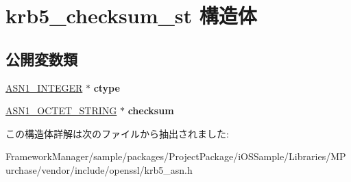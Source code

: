 \hypertarget{structkrb5__checksum__st}{}\section{krb5\+\_\+checksum\+\_\+st 構造体}
\label{structkrb5__checksum__st}
\subsection*{公開変数類}
\begin{DoxyCompactItemize}
\item 
\hypertarget{structkrb5__checksum__st_ae066058605d0c59e10a98fbd71745705}{}\hyperlink{structasn1__string__st}{A\+S\+N1\+\_\+\+I\+N\+T\+E\+G\+E\+R} $\ast$ {\bfseries ctype}\label{structkrb5__checksum__st_ae066058605d0c59e10a98fbd71745705}

\item 
\hypertarget{structkrb5__checksum__st_aaecf3ca4c97259edba8bc729103d81ba}{}\hyperlink{structasn1__string__st}{A\+S\+N1\+\_\+\+O\+C\+T\+E\+T\+\_\+\+S\+T\+R\+I\+N\+G} $\ast$ {\bfseries checksum}\label{structkrb5__checksum__st_aaecf3ca4c97259edba8bc729103d81ba}

\end{DoxyCompactItemize}


この構造体詳解は次のファイルから抽出されました\+:\begin{DoxyCompactItemize}
\item 
Framework\+Manager/sample/packages/\+Project\+Package/i\+O\+S\+Sample/\+Libraries/\+M\+Purchase/vendor/include/openssl/krb5\+\_\+asn.\+h\end{DoxyCompactItemize}
